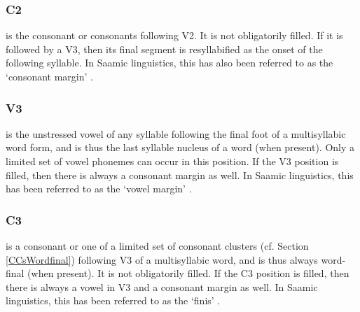 \subsubsection{C2}\label{CMarg}
 is the consonant or consonants following V2. It is not obligatorily filled. If it is followed by a V3, then its final segment is resyllabified as the onset of the following syllable. 
In Saamic linguistics, this has also been referred to as the ‘consonant margin’ \citep[cf.][p?p]{Sammallahti1998}.

\subsubsection{V3}\label{v3}
 is the unstressed vowel of any syllable following the final foot of a multisyllabic word form, and is thus the last syllable nucleus of a word (when present). Only a limited set of vowel phonemes can occur in this position. If the V3 position is filled, then there is always a consonant margin as well.  
In Saamic linguistics, this has been referred to as the ‘vowel margin’ \citep[cf.][p?p]{Sammallahti1998}.

\subsubsection{C3}\label{c3}
 is a consonant or one of a limited set of consonant clusters (cf. Section \ref{CCsWordfinal}) following V3 of a multisyllabic word, and is thus always word-final (when present). It is not obligatorily filled. If the C3 position is filled, then there is always a vowel in V3 and a consonant margin as well. 
In Saamic linguistics, this has been referred to as the ‘finis’ \citep[cf.][p?p]{Sammallahti1998}.


